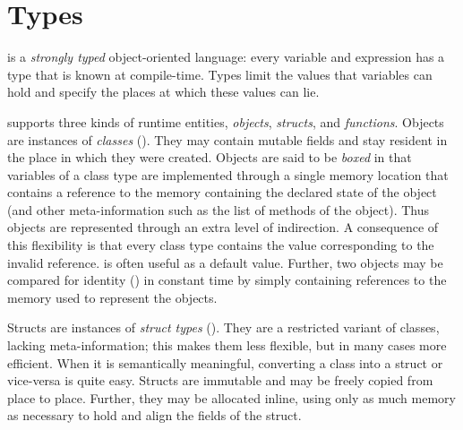 \chapter{Types}
\label{XtenTypes}

{}\Xten{} is a {\em strongly typed} object-oriented language: every
variable and expression has a type that is known at compile-time.
Types limit the values that variables can hold and specify the places
at which these values can lie.


{}\Xten{} supports three kinds of runtime entities, {\em objects},
{\em structs}, and {\em functions}. Objects are instances of {\em
  classes} (). They may contain mutable fields
and stay resident in the place in which they were
created. 
Objects are said to be {\em boxed} in that variables of a
class type are implemented through a single memory location that
contains a reference to the memory containing the declared state of
the object (and other meta-information such as the list of methods of
the object). Thus objects are represented through an extra level of
indirection. A consequence of this flexibility is that every class
type contains the value  corresponding to the invalid
reference.  is often useful as a default value. Further, two
objects may be compared for identity (\Xcd{==}) in constant time by
simply containing references to the memory used to represent the
objects.

Structs are instances of {\em struct types} (). They are a
restricted variant of classes, lacking meta-information; this makes them less
flexible, but in many cases more efficient. When it is semantically
meaningful, converting a class into a struct or vice-versa is quite easy.
Structs are immutable and may be freely copied from place to place. Further,
they may be allocated inline, using only as much memory as necessary to hold
and align the fields of the struct.

